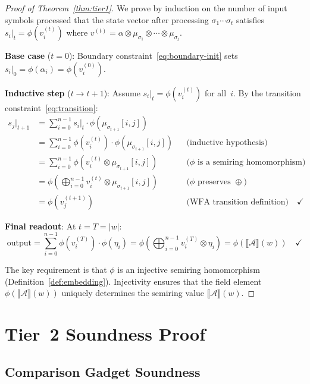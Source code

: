 \documentclass[11pt]{article}
\newcommand{\wfa}{\mathcal{A}}
\begin{document}
\begin{proof}[Proof of Theorem~\ref{thm:tier1}]
We prove by induction on the number of input symbols processed that
the state vector after processing $\sigma_1 \cdots \sigma_t$ satisfies
$s_i|_t = \phi(v_i^{(t)})$ where
$v^{(t)} = \alpha \otimes \mu_{\sigma_1} \otimes \cdots \otimes \mu_{\sigma_t}$.

\textbf{Base case} ($t=0$):
Boundary constraint~\eqref{eq:boundary-init} sets
$s_i|_0 = \phi(\alpha_i) = \phi(v_i^{(0)})$. \checkmark

\textbf{Inductive step} ($t \to t+1$):
Assume $s_i|_t = \phi(v_i^{(t)})$ for all~$i$.
By the transition constraint~\eqref{eq:transition}:
\begin{align*}
  s_j|_{t+1} &= \sum_{i=0}^{n-1} s_i|_t \cdot \phi(\mu_{\sigma_{t+1}}[i,j]) \\
  &= \sum_{i=0}^{n-1} \phi(v_i^{(t)}) \cdot \phi(\mu_{\sigma_{t+1}}[i,j])
    && \text{(inductive hypothesis)} \\
  &= \sum_{i=0}^{n-1} \phi(v_i^{(t)} \otimes \mu_{\sigma_{t+1}}[i,j])
    && \text{($\phi$ is a semiring homomorphism)} \\
  &= \phi\!\left(\bigoplus_{i=0}^{n-1} v_i^{(t)} \otimes \mu_{\sigma_{t+1}}[i,j]\right)
    && \text{($\phi$ preserves $\oplus$)} \\
  &= \phi(v_j^{(t+1)})
    && \text{(WFA transition definition)} \quad \checkmark
\end{align*}

\textbf{Final readout}:
At $t = T = |w|$:
\[
  \text{output} = \sum_{i=0}^{n-1} \phi(v_i^{(T)}) \cdot \phi(\eta_i)
  = \phi\!\left(\bigoplus_{i=0}^{n-1} v_i^{(T)} \otimes \eta_i\right)
  = \phi(\llbracket\wfa\rrbracket(w)) \quad \checkmark
\]

The key requirement is that $\phi$ is an injective semiring homomorphism
(Definition~\ref{def:embedding}).  Injectivity ensures that the field
element $\phi(\llbracket\wfa\rrbracket(w))$ uniquely determines the
semiring value $\llbracket\wfa\rrbracket(w)$.
\end{proof}


\section{Tier~2 Soundness Proof}\label{app:tier2-proof}

\subsection{Comparison Gadget Soundness}
\end{document}
